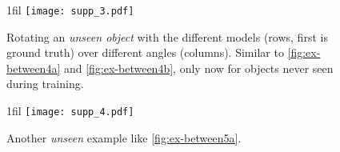 \documentclass[runningheads]{llncs}
\makeatletter
\newcommand*{\centerfloat}{%
  \parindent \z@
  \leftskip \z@ \@plus 1fil \@minus \textwidth
  \rightskip\leftskip
  \parfillskip \z@skip}
\makeatother
\begin{document}
\begin{appendix}
\begin{figure}[p] %
    \centering
    \centerfloat
    \texttt{[image: supp\_3.pdf]}
    \caption{
        Rotating an \emph{unseen object} with the different models (rows, first is ground truth) over different angles (columns).
        Similar to \autoref{fig:ex-between4a} and \ref{fig:ex-between4b}, only now for objects never seen during training.
    }
    \label{fig:ex-between5a}
\end{figure}

\begin{figure}[p] %
    \centering
    \centerfloat
    \texttt{[image: supp\_4.pdf]}
    \caption{
        Another \emph{unseen} example like \autoref{fig:ex-between5a}.
    }
    \label{fig:ex-between5b}
\end{figure}

\end{appendix}
\end{document}
